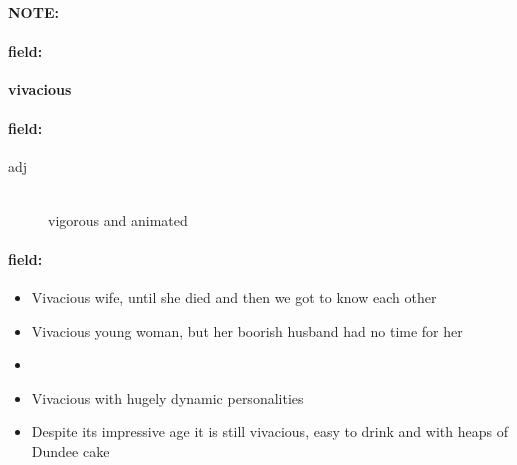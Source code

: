 \documentclass[12pt]{article}
\newenvironment{note}{\paragraph{NOTE:}}{}
\newenvironment{field}{\paragraph{field:}}{}
\begin{document}
\begin{note}
\begin{field}
\textbf{\large vivacious}
\end{field}


\begin{field}
\begin{description}
\item[adj] \hfill \\ 
vigorous and animated

\end{description}
\end{field}

\begin{field}
\begin{itemize}
\item Vivacious wife, until she died and then we got to know each other
\item Vivacious young woman, but her boorish husband had no time for her
\item 
\item Vivacious with hugely dynamic personalities
\item Despite its impressive age it is still vivacious, easy to drink and with heaps of Dundee cake
\end{itemize}
\end{field}
\end{note}
\end{document}
